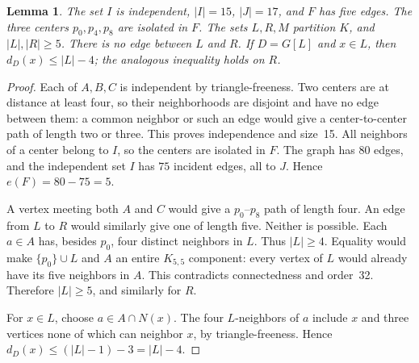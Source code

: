 \documentclass[11pt]{article}
\newtheorem{lemma}[theorem]{Lemma}
\begin{document}
\begin{lemma}\label{setup}
The set $I$ is independent, $|I|=15$, $|J|=17$, and $F$ has five edges.
The three centers $p_0,p_4,p_8$ are isolated in $F$. The sets $L,R,M$
partition $K$, and $|L|,|R|\geq5$. There is no edge between $L$ and $R$.
If $D=G[L]$ and $x\in L$, then $d_D(x)\leq |L|-4$; the analogous
inequality holds on $R$.
\end{lemma}
\begin{proof}
Each of $A,B,C$ is independent by triangle-freeness. Two centers are
at distance at least four, so their neighborhoods are disjoint and have
no edge between them: a common neighbor or such an edge would give a
center-to-center path of length two or three. This proves independence
and size~15. All neighbors of a center belong to $I$, so the centers
are isolated in $F$. The graph has $80$ edges, and the independent set
$I$ has $75$ incident edges, all to $J$. Hence $e(F)=80-75=5$.

A vertex meeting both $A$ and $C$ would give a $p_0$--$p_8$ path of
length four. An edge from $L$ to $R$ would similarly give one of length
five. Neither is possible. Each $a\in A$ has, besides $p_0$, four
distinct neighbors in $L$. Thus $|L|\geq4$. Equality would make
$\{p_0\}\cup L$ and $A$ an entire $K_{5,5}$ component: every vertex
of $L$ would already have its five neighbors in $A$. This contradicts
connectedness and order~32. Therefore $|L|\geq5$, and similarly for $R$.

For $x\in L$, choose $a\in A\cap N(x)$. The four $L$-neighbors of $a$
include $x$ and three vertices none of which can neighbor $x$, by
triangle-freeness. Hence $d_D(x)\leq (|L|-1)-3=|L|-4$.
\end{proof}
\end{document}
